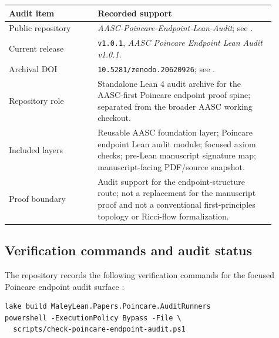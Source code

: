 \documentclass[11pt]{article}
\begin{document}
\begin{longtable}{L{0.30\linewidth}L{0.60\linewidth}}
\toprule
\textbf{Audit item} & \textbf{Recorded support}\\
\midrule
Public repository & \emph{AASC-Poincare-Endpoint-Lean-Audit}; see \cite{PoincareLeanAuditGithub2026}.\\
Current release & \texttt{v1.0.1}, \emph{AASC Poincare Endpoint Lean Audit v1.0.1}.\\
Archival DOI & \texttt{10.5281/zenodo.20620926}; see \cite{PoincareLeanAuditZenodo2026}.\\
Repository role & Standalone Lean 4 audit archive for the AASC-first Poincare endpoint proof spine; separated from the broader AASC working checkout.\\
Included layers & Reusable AASC foundation layer; Poincare endpoint Lean audit module; focused axiom checks; pre-Lean manuscript signature map; manuscript-facing PDF/source snapshot.\\
Proof boundary & Audit support for the endpoint-structure route; not a replacement for the manuscript proof and not a conventional first-principles topology or Ricci-flow formalization.\\
\bottomrule
\end{longtable}

\subsection*{Verification commands and audit status}
{}

The repository records the following verification commands for the focused Poincare endpoint audit surface \cite{PoincareLeanAuditGithub2026,PoincareLeanAuditRelease2026}:
\begin{verbatim}
lake build MaleyLean.Papers.Poincare.AuditRunners
powershell -ExecutionPolicy Bypass -File \
  scripts/check-poincare-endpoint-audit.ps1
\end{verbatim}
\end{document}
